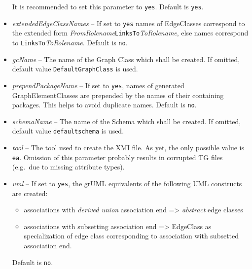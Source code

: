 \documentclass[a4paper]{article}
\begin{document}
\begin{itemize}
\begin{itemize}
		\end{itemize}
		It is recommended to set this parameter to \texttt{yes}. Default is \texttt{yes}.
		\item \emph{extendedEdgeClassNames} --  If set to \texttt{yes} names of EdgeClasses correspond to the extended form \emph{FromRolename}\texttt{LinksTo}\emph{ToRolename}, else names correspond to \texttt{LinksTo}\emph{ToRolename}. Default is \texttt{no}.
		\item \emph{gcName} -- The name of the Graph Class which shall be created. If omitted, default value  \texttt{Default\-GraphClass} is used.
		\item \emph{prependPackageName} --  If set to \texttt{yes}, names of generated GraphElementClasses are prepended by the names of their containing packages. This helps to avoid duplicate names. Default is \texttt{no}.
		\item \emph{schemaName} -- The name of the Schema which shall be created. If omitted, default value \texttt{default\-schema} is used.
		\item \emph{tool} -- The tool used to create the XMI file. As yet, the only possible value is \texttt{ea}. Omission of this parameter probably results in corrupted TG files (e.g.\ due to missing attribute types).
		\item \emph{uml} -- If set to \texttt{yes}, the grUML equivalents of the following UML constructs are created:
		\begin{itemize}
			\item associations with \emph{derived union} association end => \emph{abstract} edge classes
			\item associations with subsetting association end => EdgeClass as specialization of edge class corresponding to association with subsetted association end.
		\end{itemize}
		Default is \texttt{no}.
	\end{itemize}

	
\end{document}
